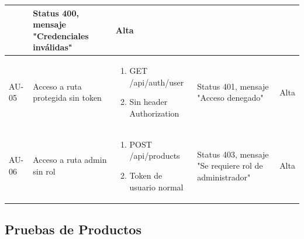 \documentclass[12pt,a4paper]{article}
\begin{document}
\begin{longtable}{|p{1cm}|p{3cm}|p{4cm}|p{3cm}|p{3cm}|}
\begin{enumerate}[leftmargin=*,nosep]
\end{enumerate} &
Status 400, mensaje "Credenciales inválidas" & Alta \\
\hline
AU-05 & Acceso a ruta protegida sin token &
\begin{enumerate}[leftmargin=*,nosep]
    \item GET /api/auth/user
    \item Sin header Authorization
\end{enumerate} &
Status 401, mensaje "Acceso denegado" & Alta \\
\hline
AU-06 & Acceso a ruta admin sin rol &
\begin{enumerate}[leftmargin=*,nosep]
    \item POST /api/products
    \item Token de usuario normal
\end{enumerate} &
Status 403, mensaje "Se requiere rol de administrador" & Alta \\
\hline
\end{longtable}

\subsection{Pruebas de Productos}
\end{document}

